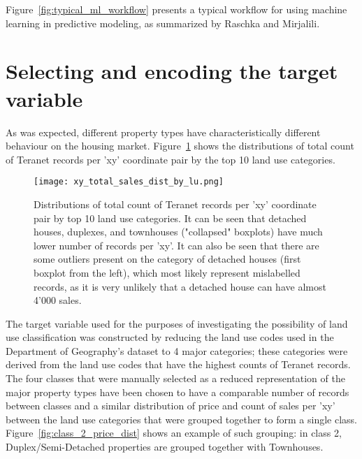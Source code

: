 Figure~\ref{fig:typical_ml_workflow} presents a typical workflow for using machine learning in predictive modeling, as summarized by Raschka and Mirjalili\cite{RaschkaMirjalili2017}.

\section{Selecting and encoding the target variable} \label{sec:select_encode_target}

As was expected, different property types have characteristically different behaviour on the housing market.
Figure~\ref{fig:xy_total_sales_dist_by_lu} shows the distributions of total count of Teranet records per 'xy' coordinate pair by the top 10 land use categories.

\begin{figure}[hbt!]
    \centering
    \texttt{[image: xy\_total\_sales\_dist\_by\_lu.png]}
    \caption{Distributions of total count of Teranet records per 'xy' coordinate pair by top 10 land use categories.
    It can be seen that detached houses, duplexes, and townhouses ("collapsed" boxplots) have much lower number of records per 'xy'.
    It can also be seen that there are some outliers present on the category of detached houses (first boxplot from the left), which most likely represent mislabelled records, as it is very unlikely that a detached house can have almost 4'000 sales.}
    \label{fig:xy_total_sales_dist_by_lu}
\end{figure}

The target variable used for the purposes of investigating the possibility of land use classification was constructed by reducing the land use codes used in the Department of Geography's dataset to 4 major categories;
these categories were derived from the land use codes that have the highest counts of Teranet records.
The four classes that were manually selected as a reduced representation of the major property types have been chosen to have a comparable number of records between classes and a similar distribution of price and count of sales per 'xy' between the land use categories that were grouped together to form a single class.
Figure~\ref{fig:class_2_price_dist} shows an example of such grouping: in class 2, Duplex/Semi-Detached properties are grouped together with Townhouses.

